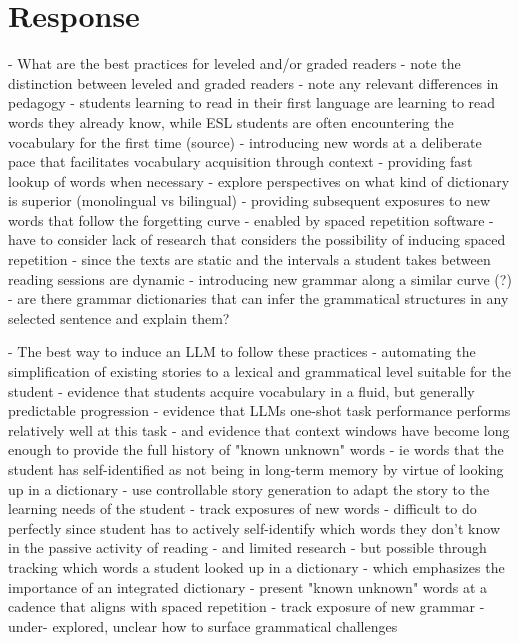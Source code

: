 \documentclass[
	letterpaper, %
]{jdf}
\begin{document}
\section{Response}

- What are the best practices for leveled and/or graded readers
  - note the distinction between leveled and graded readers
    - note any relevant differences in pedagogy
      - students learning to read in their first language are learning to read words they already know, while ESL students are often encountering the vocabulary for the first time (source)
  - introducing new words at a deliberate pace that facilitates vocabulary acquisition through context
  - providing fast lookup of words when necessary
    - explore perspectives on what kind of dictionary is superior (monolingual vs bilingual)
  - providing subsequent exposures to new words that follow the forgetting curve
    - enabled by spaced repetition software
    - have to consider lack of research that considers the possibility of inducing spaced repetition
      - since the texts are static and the intervals a student takes between reading sessions are dynamic
  - introducing new grammar along a similar curve (?)
    - are there grammar dictionaries that can infer the grammatical structures in any selected sentence and explain them?
      
- The best way to induce an LLM to follow these practices
  - automating the simplification of existing stories to a lexical and grammatical level suitable for the student
    - evidence that students acquire vocabulary in a fluid, but generally predictable progression
    - evidence that LLMs one-shot task performance performs relatively well at this task
      - and evidence that context windows have become long enough to provide the full history of "known unknown" words
        - ie words that the student has self-identified as not being in long-term memory by virtue of looking up in a dictionary
  - use controllable story generation to adapt the story to the learning needs of the student 
    - track exposures of new words 
      - difficult to do perfectly since student has to actively self-identify which words they don't know in the passive activity of reading
        - and limited research
        - but possible through tracking which words a student looked up in a dictionary
          - which emphasizes the importance of an integrated dictionary
    - present "known unknown" words at a cadence that aligns with spaced repetition
    - track exposure of new grammar
      - under- explored, unclear how to surface grammatical challenges


\printbibliography{}
\end{document}
